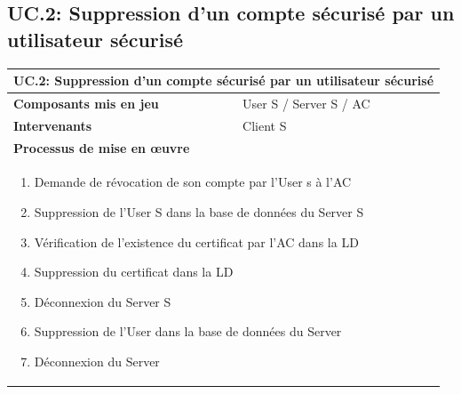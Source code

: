 \documentclass[a4paper,11pt,french]{article}
\begin{document}

\subsection{UC.2: Suppression d'un compte sécurisé par un utilisateur sécurisé}
\begin{center}
	\vspace*{0.7cm}
	\begin{tabularx}{16cm}{|l|X|}
	\hline
	\multicolumn{2}{|l|}{\textbf{UC.2: Suppression d'un compte sécurisé par un utilisateur sécurisé}}\\
	\hline
	\textbf{Composants mis en jeu} &  User S / Server S / AC \\
	\hline
	\textbf{Intervenants} & Client S\\
	\hline
	\multicolumn{2}{|l|}{\textbf{Processus de mise en \oe uvre}}\\
	\hline
	\multicolumn{2}{|p{15cm}|}{\begin{enumerate}\item Demande de révocation de son compte par l'User s à l'AC \item Suppression de l'User S dans la base de données du Server S \item Vérification de l'existence du certificat par l'AC dans la LD \item Suppression du certificat dans la LD \item Déconnexion du Server S \item Suppression de l'User  dans la base de données du Server\item Déconnexion du Server \end{enumerate}}\\
	\hline
	\end{tabularx}
\end{center}
\end{document}
